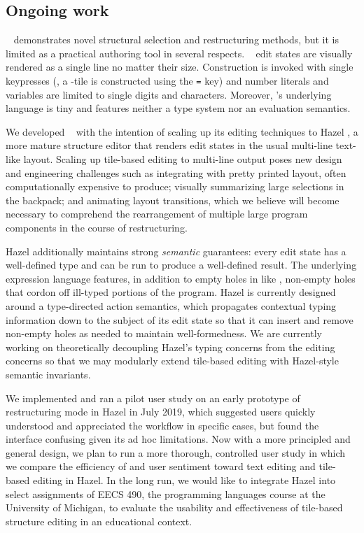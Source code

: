 \subsection{Ongoing work}

\tylr~ demonstrates novel structural selection and restructuring
methods, but it is limited
as a practical authoring tool in several respects.
\tylr~ edit states are visually rendered as a single line
no matter their size.
Construction is invoked with single keypresses (\eg,
a -tile is constructed using the \texttt{=} key)
and number literals and variables are limited to
single digits and characters.
Moreover, \tylr's underlying language is tiny and
features neither a type system nor an evaluation semantics.

We developed \tylr~ with the intention of scaling up
its editing techniques to Hazel \cite{HazelnutSNAPL},
a more mature structure editor that renders
edit states in the usual multi-line text-like layout.
Scaling up tile-based editing to multi-line output
poses new design and engineering challenges
such as integrating with pretty printed layout,
often computationally expensive to produce;
visually summarizing large selections in the backpack;
and animating layout transitions, which
we believe will become necessary to
comprehend the rearrangement of multiple large program
components in the course of restructuring.

Hazel additionally maintains strong
\emph{semantic} guarantees: every edit state
has a well-defined type and can be run to
produce a well-defined result.
The underlying expression language features, in
addition to empty holes in like \tylr, non-empty
holes that cordon off ill-typed portions
of the program.
Hazel is currently designed around
a type-directed action semantics, which
propagates contextual typing information
down to the subject of its edit state
so that it can insert and remove non-empty holes
as needed to maintain well-formedness.
We are currently working on theoretically decoupling
Hazel's typing concerns from the editing concerns
so that we may modularly extend tile-based editing
with Hazel-style semantic invariants.

We implemented and ran a pilot user study on an early
prototype of restructuring mode in Hazel in July 2019, which suggested
users quickly understood and appreciated the workflow in specific
cases, but found the interface confusing given its ad hoc limitations.
Now with a more principled and general design,
we plan to run a more thorough, controlled user study in which
we compare the efficiency of and user sentiment
toward text editing and tile-based editing in Hazel.
In the long run, we would like to integrate Hazel into
select assignments of EECS 490, the programming languages
course at the University of Michigan, to evaluate the
usability and effectiveness of tile-based structure editing
in an educational context.
